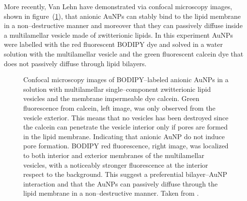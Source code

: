 More recently, Van Lehn \etal{} \cite{VanLehn2013} have demonstrated via confocal microscopy images, shown in 
figure~(\ref{fig:fluorescent}), that anionic \acp{AuNP} can stably bind to the lipid membrane in a 
non--destructive manner and moreover that they can passively diffuse inside a multilamellar vesicle made of 
zwitterionic lipids. In this experiment \acp{AuNP} were labelled with the red fluorescent BODIPY dye and solved in 
a water solution with the multilamellar vesicle and the green fluorescent calcein dye that does not passively 
diffuse through lipid bilayers.
\begin{figure}[!ht]
	\centering
	\qquad\qquad\qquad%
	\caption{Confocal microscopy images of BODIPY--labeled anionic \acp{AuNP} in a solution with multilamellar single--component zwitterionic lipid vesicles and the membrane impermeable dye calcein. Green fluorescence from calcein, left image, was only observed from the vesicle exterior. This means that no vesicles has been destroyed since the calcein can penetrate the vesicle interior only if pores are formed in the lipid membrane. Indicating that anionic \acs{AuNP} do not induce pore formation. BODIPY red fluorescence, right image, was localized to both interior and exterior membranes of the multilamellar vesicles, with a noticeably stronger fluorescence at the interior respect to the background. This suggest a preferential bilayer--\acs{AuNP} interaction and that the \acp{AuNP} can passively diffuse through the lipid membrane in a non--destructive manner. Taken from \cite{VanLehn2013}.}%
	\label{fig:fluorescent}
\end{figure}


